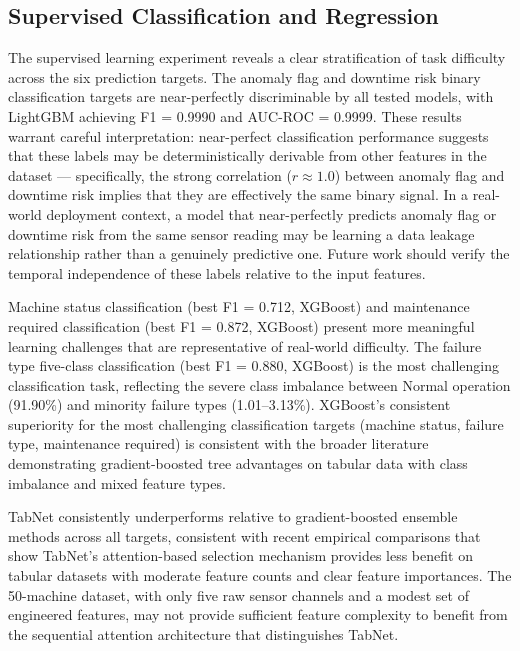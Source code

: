 \subsection{Supervised Classification and Regression}

The supervised learning experiment reveals a clear stratification of task difficulty across the six prediction targets. The anomaly flag and downtime risk binary classification targets are near-perfectly discriminable by all tested models, with LightGBM achieving F1 = 0.9990 and AUC-ROC = 0.9999. These results warrant careful interpretation: near-perfect classification performance suggests that these labels may be deterministically derivable from other features in the dataset --- specifically, the strong correlation ($r \approx 1.0$) between anomaly flag and downtime risk implies that they are effectively the same binary signal. In a real-world deployment context, a model that near-perfectly predicts anomaly flag or downtime risk from the same sensor reading may be learning a data leakage relationship rather than a genuinely predictive one. Future work should verify the temporal independence of these labels relative to the input features.

Machine status classification (best F1 = 0.712, XGBoost) and maintenance required classification (best F1 = 0.872, XGBoost) present more meaningful learning challenges that are representative of real-world difficulty. The failure type five-class classification (best F1 = 0.880, XGBoost) is the most challenging classification task, reflecting the severe class imbalance between Normal operation (91.90\%) and minority failure types (1.01--3.13\%). XGBoost's consistent superiority for the most challenging classification targets (machine status, failure type, maintenance required) is consistent with the broader literature demonstrating gradient-boosted tree advantages on tabular data with class imbalance and mixed feature types.

TabNet consistently underperforms relative to gradient-boosted ensemble methods across all targets, consistent with recent empirical comparisons that show TabNet's attention-based selection mechanism provides less benefit on tabular datasets with moderate feature counts and clear feature importances. The 50-machine dataset, with only five raw sensor channels and a modest set of engineered features, may not provide sufficient feature complexity to benefit from the sequential attention architecture that distinguishes TabNet.

